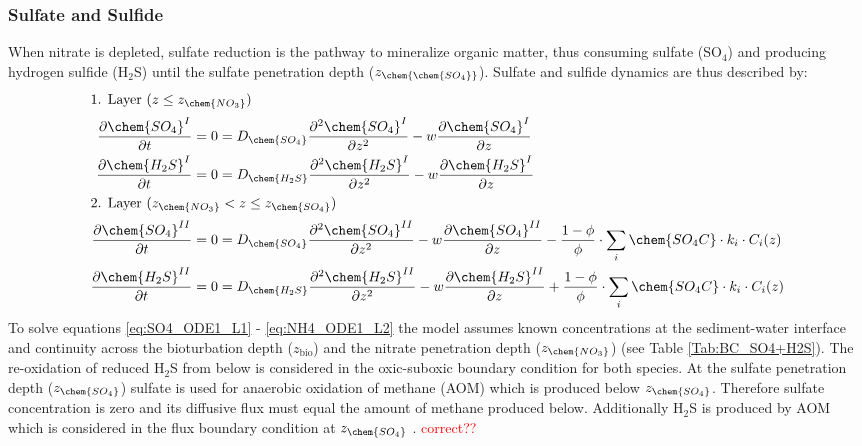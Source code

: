 \documentclass[gmd, manuscript]{copernicus}
\begin{document}
\subsubsection{Sulfate and Sulfide}
When nitrate is depleted, sulfate reduction is the pathway to mineralize organic matter, thus consuming sulfate (SO$_4$) and producing hydrogen sulfide (H$_2$S) until the sulfate penetration depth ($z_{\chem{\chem{SO_4}}}$). 
Sulfate and sulfide dynamics are thus described by:
\begin{align}
\intertext{1. Layer ($z \leq z_{\chem{NO_3}}$)}
 \frac{\partial \chem{SO_4}^I}{\partial t} &= 0 = D_{\chem{SO_4}} \frac{\partial^2\chem{SO_4}^I }{\partial z^2} - w\frac{\partial \chem{SO_4}^I }{\partial z} \label{eq:SO4_ODE1_L1}\\ %
 \frac{\partial \chem{H_2S}^I}{\partial t} &= 0 = D_{\chem{H_2S}} \frac{\partial^2\chem{H_2S}^I }{\partial z^2} - w\frac{\partial \chem{H_2S}^I }{\partial z}\label{eq:H2S_ODE1_L1}\\
 \intertext{2. Layer ($z_{\chem{NO_3}} < z \leq z_{\chem{SO_4}}$)} 
\frac{\partial \chem{SO_4}^{II}}{\partial t} &= 0 = D_{\chem{SO_4}} \frac{\partial^2\chem{SO_4}^{II} }{\partial z^2} - w\frac{\partial \chem{SO_4}^{II} }{\partial z} - \frac{1-\phi}{\phi} \cdot \sum_i \chem{SO_4C} \cdot k_i \cdot C_{i}(z) \label{eq:NO3_ODE1_L2}\\
\frac{\partial \chem{H_2S}^{II}}{\partial t} &= 0 = D_{\chem{H_2S}} \frac{\partial^2\chem{H_2S}^{II} }{\partial z^2} - w\frac{\partial \chem{H_2S}^{II} }{\partial z} + \frac{1-\phi}{\phi} \cdot \sum_i \chem{SO_4C}  \cdot k_i \cdot C_{i}(z)\label{eq:NH4_ODE1_L2}
\end{align}
To solve equations \ref{eq:SO4_ODE1_L1} - \ref{eq:NH4_ODE1_L2} the model assumes known concentrations at the sediment-water interface and continuity 
across the bioturbation depth ($z_{\mathrm{bio}}$) and the nitrate penetration depth ($z_{\chem{NO_3}}$) (see Table \ref{Tab:BC_SO4+H2S}). The re-oxidation of reduced H$_2$S from below is considered in the oxic-suboxic boundary condition 
for both species. At the sulfate penetration depth ($z_{\chem{SO_4}}$) sulfate is used for anaerobic oxidation of methane (AOM) which is produced below $z_{\chem{SO_4}}$. Therefore sulfate concentration is zero and its diffusive flux must equal 
the amount of methane produced below. Additionally H$_2$S is produced by AOM which is considered in the flux boundary condition at $z_{\chem{SO_4}}$ . \textcolor{red}{correct??}\\
\end{document}
